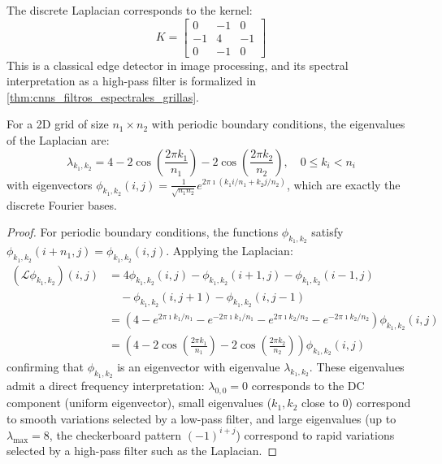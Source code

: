 \begin{example}
The discrete Laplacian corresponds to the kernel:
\[
K = \begin{bmatrix}
 0 & -1 &  0 \\
-1 &  4 & -1 \\
 0 & -1 &  0
\end{bmatrix}
\]
This is a classical edge detector in image processing, and its spectral interpretation as a high-pass filter is formalized in \autoref{thm:cnns_filtros_espectrales_grillas}.
\end{example}

\begin{proposition}\label{prop:eigenvalores_laplaciano_grilla}
For a 2D grid of size $n_1 \times n_2$ with periodic boundary conditions, the eigenvalues of the Laplacian are:
\begin{equation}
\lambda_{k_1,k_2} = 4 - 2\cos\!\left(\frac{2\pi k_1}{n_1}\right) - 2\cos\!\left(\frac{2\pi k_2}{n_2}\right), \quad 0 \leq k_i < n_i
\end{equation}
with eigenvectors $\phi_{k_1,k_2}(i,j) = \frac{1}{\sqrt{n_1 n_2}} e^{2\pi \imath(k_1 i/n_1 + k_2 j/n_2)}$, which are exactly the discrete Fourier bases.
\end{proposition}

\begin{proof}
For periodic boundary conditions, the functions $\phi_{k_1,k_2}$ satisfy $\phi_{k_1,k_2}(i + n_1, j) = \phi_{k_1,k_2}(i,j)$. Applying the Laplacian:
\begin{align}
(\mathcal{L}\phi_{k_1,k_2})(i,j) &= 4\phi_{k_1,k_2}(i,j) - \phi_{k_1,k_2}(i+1,j) - \phi_{k_1,k_2}(i-1,j) \nonumber \\
&\quad - \phi_{k_1,k_2}(i,j+1) - \phi_{k_1,k_2}(i,j-1) \\
&= \left(4 - e^{2\pi \imath k_1/n_1} - e^{-2\pi \imath k_1/n_1} - e^{2\pi \imath k_2/n_2} - e^{-2\pi \imath k_2/n_2}\right)\phi_{k_1,k_2}(i,j) \\
&= \left(4 - 2\cos\!\left(\frac{2\pi k_1}{n_1}\right) - 2\cos\!\left(\frac{2\pi k_2}{n_2}\right)\right)\phi_{k_1,k_2}(i,j)
\end{align}
confirming that $\phi_{k_1,k_2}$ is an eigenvector with eigenvalue $\lambda_{k_1,k_2}$. These eigenvalues admit a direct frequency interpretation: $\lambda_{0,0} = 0$ corresponds to the DC component (uniform eigenvector), small eigenvalues ($k_1, k_2$ close to $0$) correspond to smooth variations selected by a low-pass filter, and large eigenvalues (up to $\lambda_{\max} = 8$, the checkerboard pattern $(-1)^{i+j}$) correspond to rapid variations selected by a high-pass filter such as the Laplacian.
\end{proof}

